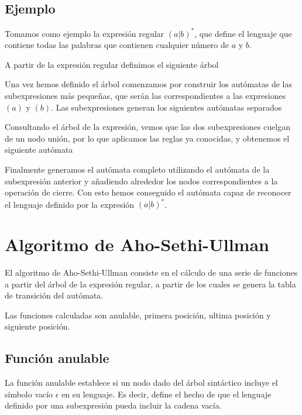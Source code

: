 
\subsection{Ejemplo}
Tomamos como ejemplo la expresión regular $(a|b)^*$, que define el lenguaje que contiene todas las palabras que contienen cualquier número de $a$ y $b$.

A partir de la expresión regular definimos el siguiente árbol


Una vez hemos definido el árbol comenzamos por construir los autómatas de las subexpresiones más pequeñas, que serán las correspondientes a las expresiones $(a)$ y $(b)$.
Las subexpresiones generan los siguientes autómatas separados


Consultando el árbol de la expresión, vemos que las dos subexpresiones cuelgan de un nodo unión, por lo que aplicamos las reglas ya conocidas, y obtenemos el siguiente autómata


Finalmente generamos el autómata completo utilizando el autómata de la subexpresión anterior y añadiendo alrededor los nodos correspondientes a la operación de cierre.
Con esto hemos conseguido el autómata capaz de reconocer el lenguaje definido por la expresión $(a|b)^*$.


\section{Algoritmo de Aho-Sethi-Ullman}
El algoritmo de Aho-Sethi-Ullman \cite{dragon} consiste en el cálculo de una serie de funciones a partir del árbol de la expresión regular, a partir de los cuales se genera la tabla de transición del autómata.

Las funciones calculadas son anulable, primera posición, ultima posición y siguiente posición.

\subsection{Función anulable}
La función anulable establece si un nodo dado del árbol sintáctico incluye el símbolo vacío $ \epsilon $ en su lenguaje.
Es decir, define el hecho de que el lenguaje definido por una subexpresión pueda incluir la cadena vacía.

